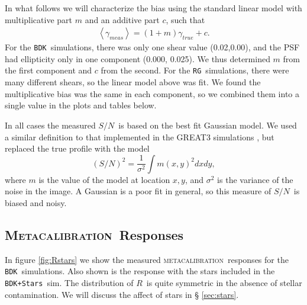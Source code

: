 \documentclass[iop]{emulateapj}
\newcommand{\snr}{$S/N$}
\newcommand{\mcal}{\textsc{metacalibration}}
\newcommand{\Mcal}{\textsc{Metacalibration}}
\newcommand{\mcalR}{\mbox{\boldmath $R$}}
\newcommand{\nsimShear}{0.02,0.00}
\newcommand{\bdksim}{\texttt{BDK}}
\newcommand{\bdstar}{\texttt{BDK+Stars}}
\newcommand{\rgsim}{\texttt{RG}}
\begin{document}
In what follows we will characterize the bias using the standard linear model
\citep[e.g.][]{great3} with multiplicative part $m$ and an additive part $c$,
such that
\begin{align}
	\left< \gamma_{meas} \right> = (1+m) \gamma_{true} + c.
\end{align}
For the \bdksim\ simulations, there was only one shear value (\nsimShear),
and the PSF had ellipticity only in one component (0.000, 0.025). We
thus determined $m$ from the first component and $c$ from the
second.  For the \rgsim\ simulations, there were many different shears,
so the linear model above was fit.  We found the multiplicative
bias was the same in each component, so we combined them into
a single value in the plots and tables below.

In all cases the measured \snr\ is based on the best fit Gaussian model. 
We used a similar definition to that implemented in the GREAT3 simulations \citep[][equation
16]{great3}, but replaced the true profile with the model
\begin{equation}
    (S/N)^2 = \frac{1}{\sigma^2} \int m(x,y)^2 dx dy,
\end{equation}
where $m$ is the value of the model at location $x,y$, and $\sigma^2$ is the
variance of the noise in the image. A Gaussian is a poor fit in general, so
this measure of \snr\ is biased and noisy.

\subsection{\Mcal\ Responses}

In figure \ref{fig:Rstars} we show the measured \mcal\ responses for the
\bdksim\  simulations.  Also shown is the response with the stars included in
the \bdstar\ sim.  The distribution of \mcalR\ is quite symmetric in the
absence of stellar contamination.  We will discuss the affect of stars in \S
\ref{sec:stars}.
\end{document}
